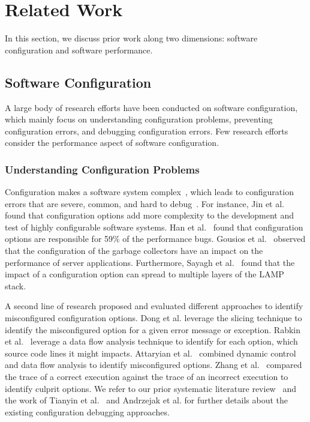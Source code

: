 \section{Related Work}
\label{sec:relatedwork}

In this section, we discuss prior work along two dimensions: software configuration and software performance. %

\subsection{Software Configuration}

A large body of research efforts have been conducted on software configuration, which mainly focus on understanding configuration problems, preventing configuration errors, and debugging configuration errors. Few research efforts consider the performance aspect of software configuration. 

\subsubsection{Understanding Configuration Problems}
Configuration makes a software system complex~\cite{tse}, which leads to configuration errors that are severe, common, and hard to debug~\cite{RN3251}. For instance, Jin et al.~\cite{RN2897} found that configuration options add more complexity to the development and test of highly configurable software systems. Han et al.~\cite{RN2864} found that configuration options are responsible for 59\% of the performance bugs. Gousios et al.~\cite{RN3551} observed that the configuration of the garbage collectors have an impact on the performance of server applications. Furthermore, Sayagh et al.~\cite{RN3249, RN2758} found that the impact of a configuration option can spread to multiple layers of the LAMP stack.%

A second line of research proposed and evaluated different approaches to identify misconfigured configuration options. Dong et al.\cite{RN2805, RN3163} leverage the slicing technique to identify the misconfigured option for a given error message or exception. Rabkin et al.~\cite{RN2822} leverage a data flow analysis technique to identify for each option, which source code lines it might impacts. Attaryian et al.~\cite{RN3248} combined dynamic control and data flow analysis to identify misconfigured options. Zhang et al.~\cite{RN2839, RN2777} compared the trace of a correct execution against the trace of an incorrect execution to identify culprit options. We refer to our prior systematic literature review~\cite{tse} and the work of Tianyin et al.~\cite{RN3252} and Andrzejak et al.\cite{andrzejaksoftware} for further details about the existing configuration debugging approaches. 

